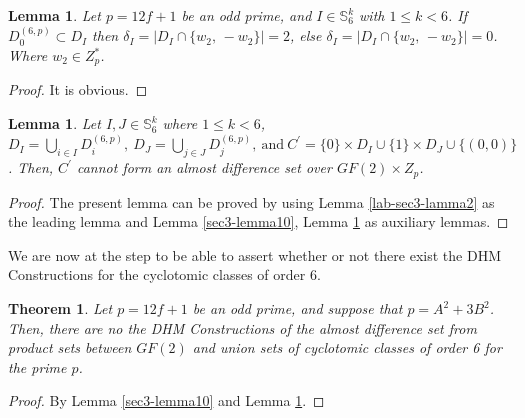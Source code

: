 \documentclass[letter]{ieice}
\newtheorem{sec3_thm1}{Theorem}\newtheorem{sec3_thm2}[sec3_thm1]{Theorem}
\newtheorem{sec3_lemma11}[sec3_lemma1]{Lemma}
\newtheorem{sec3_lemma12}[sec3_lemma1]{Lemma}
\begin{document}
\begin{sec3_lemma11}\label{sec3-lemma11}
Let $ p=12f+1 $ be an odd prime, and $ I \in  \mathbb{S}_{6}^{k}$ with $ 1\leq k<6 $. If $ D_{0}^{(6,p)}\subset \mathit{D}_{I} $ then $ \delta_{I}= |\mathit{D}_{I}\cap \lbrace w_{2},\,-w_{2}\rbrace|=2 $, else  $ \delta_{I}= |\mathit{D}_{I}\cap \lbrace w_{2},\,-w_{2}\rbrace|=0$. Where $ w_{2}\in Z_{p}^{*} $.
\end{sec3_lemma11} 
\begin{proof}
It is obvious.
\end{proof}

\begin{sec3_lemma12}\label{sec3-lemma12}
Let $ I, J \in  \mathbb{S}_{6}^{k}$ where $ 1\leq k<6 $,  $ \mathit{D}_{I}=\bigcup_{i\in I}D_{i}^{(6,p)},\  \mathit{D}_{J}=\bigcup_{j\in J}D_{j}^{(6,p)},\ \mbox{and}\ \mathit{C}^{'}=\lbrace 0\rbrace\times  \mathit{D}_{I}\cup \lbrace 1\rbrace\times  \mathit{D}_{J} \cup \lbrace (0,0)\rbrace$. Then, $ \mathit{C}^{'} $ cannot form an almost difference set over $ GF(2)\times Z_{p} $.
\end{sec3_lemma12}
\begin{proof}
The present lemma can be proved by using Lemma \ref{lab-sec3-lamma2} as the leading lemma and Lemma \ref{sec3-lemma10}, Lemma \ref{sec3-lemma11} as auxiliary lemmas.
\end{proof}

We are now at the step to be able to assert whether or not there exist the DHM Constructions for the cyclotomic classes of order 6.

\begin{sec3_thm1}\label{sec3-theorem1}
Let $ p=12f+1 $ be an odd prime, and suppose that $ p=A^{2}+3B^{2} $. Then, there are no the DHM Constructions of the almost difference set from product sets between $ GF(2) $ and union sets of cyclotomic classes of order 6 for the prime $ p $.
\end{sec3_thm1}
\begin{proof}
By Lemma \ref{sec3-lemma10} and Lemma \ref{sec3-lemma12}.
\end{proof}
\end{document}
